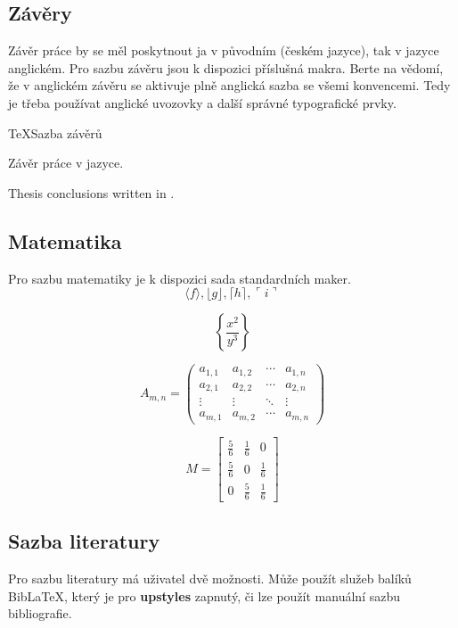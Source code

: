 \documentclass[
  master=false,               %
  font=sans,                  %
  printversion=false,         %
  joinlists=true,             %
  glossaries=true,            %
  figures=true,               %
  tables=true,                %
  sourcecodes=true,					  %
  theorems=true,						  %
  bibencoding=utf8,           %
  language=czech,             %
  encoding=utf8,              %
  field=inf,                  %
  index=true,                 %
  biblatex=true               %
]{updiplom}
\begin{document}
\subsection{Závěry}
Závěr práce by se měl poskytnout ja v původním (českém jazyce), tak v jazyce anglickém. Pro sazbu závěru jsou k dispozici příslušná makra. Berte na vědomí, že v anglickém závěru se aktivuje plně anglická sazba se všemi konvencemi. Tedy je třeba používat anglické uvozovky a další správné typografické prvky.

\begin{upcode}{TeX}{}{Sazba závěrů}
\begin{upconclusions}
Závěr práce v  jazyce.
\end{upconclusions}

\begin{upconclusions}[english]
Thesis conclusions written in .
\end{upconclusions}
\end{upcode}

\subsection{Matematika}
Pro sazbu matematiky je k dispozici sada standardních maker.
$$\langle f \rangle, \lfloor g \rfloor,
\lceil h \rceil, \ulcorner i \urcorner$$

$$\left\{\frac{x^2}{y^3}\right\}$$

$$
A_{m,n} =
 \begin{pmatrix}
  a_{1,1} & a_{1,2} & \cdots & a_{1,n} \\
  a_{2,1} & a_{2,2} & \cdots & a_{2,n} \\
  \vdots  & \vdots  & \ddots & \vdots  \\
  a_{m,1} & a_{m,2} & \cdots & a_{m,n}
 \end{pmatrix}
$$

$$
M = \begin{bmatrix}
       \frac{5}{6} & \frac{1}{6} & 0           \\[0.3em]
       \frac{5}{6} & 0           & \frac{1}{6} \\[0.3em]
       0           & \frac{5}{6} & \frac{1}{6}
     \end{bmatrix}
$$

\subsection{Sazba literatury}
Pro sazbu literatury má uživatel dvě možnosti. Může použít služeb balíků Bib\LaTeX{}, který je pro \textbf{upstyles} zapnutý, či lze použít manuální sazbu bibliografie.
\end{document}
